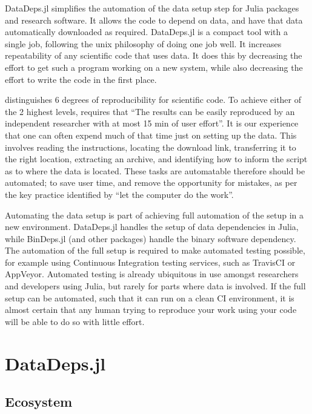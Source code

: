 \documentclass[twoside,11pt]{article}\usepackage{jmlr2e}
\begin{document}
DataDeps.jl simplifies the automation of the data setup step for Julia \citep{Julia}  packages and research software.
It allows the code to depend on data, and have that data automatically downloaded as required.
DataDeps.jl is a compact tool with a single job, following the unix philosophy of doing one job well.
It increases repeatability of any scientific code that uses data.
It does this by decreasing the effort to get such a program working on a new system,
while also decreasing the effort to write the code in the first place.


\citet{VabdewakkeReproduceableResearch} distinguishes 6 degrees of reproducibility for scientific code.
To achieve either of the 2 highest levels,
requires that ``The results can be easily reproduced by an independent researcher with at most 15 min of user effort''.
It is our experience that one can often expend much of that time just on setting up the data.
This involves reading the instructions, locating the download link, transferring it to the right location, extracting an archive, and identifying how to inform the script as to where the data is located.
These tasks are automatable therefore should be automated; to save user time, and remove the opportunity for mistakes, as per the key practice identified by \citet{10.1371/journal.pbio.1001745} ``let the computer do the work''.

Automating the data setup is part of achieving full automation of the setup in  a new environment.
DataDeps.jl handles the setup of data dependencies in Julia, while BinDeps.jl (and other packages) handle the binary software dependency.
The automation of the full setup is required to make automated testing possible, for example using Continuous Integration testing services, such as TravisCI or AppVeyor. Automated testing is already ubiquitous in use amongst researchers and developers using Julia, but rarely for parts where data is involved.
If the full setup can be automated, such that it can run on a clean CI environment,
it is almost certain that any human trying to reproduce your work 
using your code will be able to do so with little effort.




\section{DataDeps.jl}
\subsection{Ecosystem}
\end{document}
